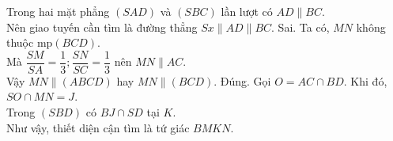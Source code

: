\begin{ex}
{\begin{itemchoice}
   Trong hai mặt phẳng $ (SAD) $  và $ (SBC) $ lần lượt có $ AD \parallel BC $.\\
   Nên giao tuyến cần tìm là đường thẳng  $ Sx \parallel AD \parallel BC $.
   \itemch Sai. Ta có, $MN$ không thuộc mp$(BCD)$.\\ 
   Mà $\dfrac{SM}{SA}  = \dfrac{1}{3};\dfrac{SN}{SC} = \dfrac{1}{3}$ nên $ MN \parallel AC$.\\
   Vậy $ MN \parallel (ABCD)$ hay  $MN \parallel (BCD)$.
   \itemch Đúng. Gọi $ O=AC \cap BD $. Khi đó, $ SO\cap  MN = J $.\\
    Trong $ (SBD) $ có $ BJ\cap SD $ tại $K$. \\
   Như vậy, thiết diện  cận tìm là tứ giác $ BMKN $.
  \end{itemchoice}
  }
\end{ex}

